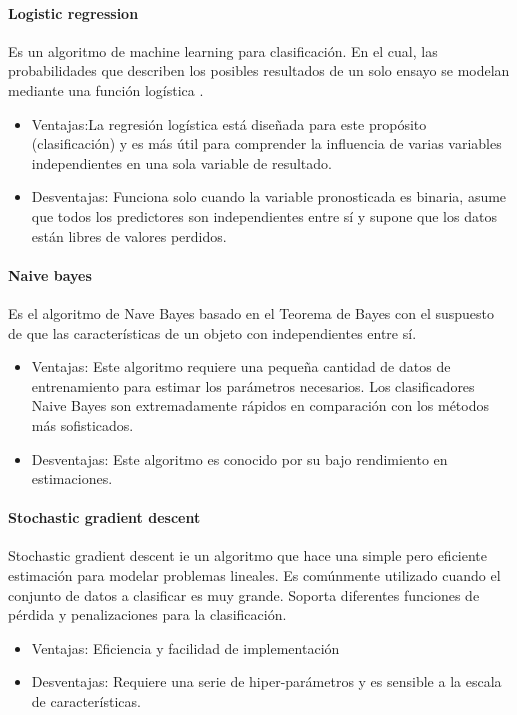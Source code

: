 \paragraph{Logistic regression} Es un algoritmo de machine learning para clasificación. En el cual, las probabilidades que describen los posibles resultados de un solo ensayo se modelan mediante una función logística \citep{MarcoTeorico12}.
\begin{itemize}
	\item Ventajas:La regresión logística está diseñada para este propósito (clasificación) y es más útil para comprender la influencia de varias variables independientes en una sola variable de resultado.
	\item Desventajas: Funciona solo cuando la variable pronosticada es binaria, asume que todos los predictores son independientes entre sí y supone que los datos están libres de valores perdidos.
\end{itemize}
\paragraph{Naive bayes} Es el algoritmo de Nave Bayes basado en el Teorema de Bayes con el suspuesto de que las características de un objeto con independientes entre sí\citep{MarcoTeorico12}.
\begin{itemize}
	\item Ventajas: Este algoritmo requiere una pequeña cantidad de datos de entrenamiento para estimar los parámetros necesarios. Los clasificadores Naive Bayes son extremadamente rápidos en comparación con los métodos más sofisticados.
	\item Desventajas: Este algoritmo es conocido por su bajo rendimiento en estimaciones.
\end{itemize}
\paragraph{Stochastic gradient descent} Stochastic gradient descent ie un algoritmo que hace una simple pero eficiente estimación para modelar problemas lineales. Es comúnmente utilizado cuando el conjunto de datos a clasificar es muy grande. Soporta diferentes funciones de pérdida y penalizaciones para la clasificación\citep{MarcoTeorico12}.
\begin{itemize}
	\item Ventajas: Eficiencia y facilidad de implementación
	\item Desventajas: Requiere una serie de hiper-parámetros y es sensible a la escala de características.
\end{itemize}
